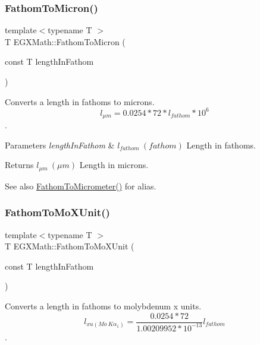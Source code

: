 \subsubsection{\texorpdfstring{Fathom\+To\+Micron()}{FathomToMicron()}}
{\footnotesize\ttfamily template$<$typename T $>$ \\
T E\+G\+X\+Math\+::\+Fathom\+To\+Micron (\begin{DoxyParamCaption}\item[{const T}]{length\+In\+Fathom }\end{DoxyParamCaption})}



Converts a length in fathoms to microns. \[ l_{\mu m}=0.0254 * 72 * l_{fathom} * 10^{6} \]. 


\begin{DoxyParams}{Parameters}
{\em length\+In\+Fathom} & $ l_{fathom}\ (fathom)$ Length in fathoms. \\
\hline
\end{DoxyParams}
\begin{DoxyReturn}{Returns}
$ l_{\mu m}\ (\mu m)$ Length in microns. 
\end{DoxyReturn}
\begin{DoxySeeAlso}{See also}
\mbox{\hyperlink{group___e_g_x_math-_conversions-_length_conversions-_imperial-_fathom-_s_i_gabc04c2f094545c3ae8d4e493e4af417e}{Fathom\+To\+Micrometer()}} for alias. 
\end{DoxySeeAlso}
\mbox{\label{group___e_g_x_math-_conversions-_length_conversions-_imperial-_fathom-_non-_s_i_ga1e69cf778d1b7f72cd015b6cc81fc71c}} 
\subsubsection{\texorpdfstring{Fathom\+To\+Mo\+X\+Unit()}{FathomToMoXUnit()}}
{\footnotesize\ttfamily template$<$typename T $>$ \\
T E\+G\+X\+Math\+::\+Fathom\+To\+Mo\+X\+Unit (\begin{DoxyParamCaption}\item[{const T}]{length\+In\+Fathom }\end{DoxyParamCaption})}



Converts a length in fathoms to molybdenum x units. \[ l_{xu(Mo\ K\alpha_1)}=\frac{0.0254 * 72}{1.00209952*10^{-13}} l_{fathom}\]. 


